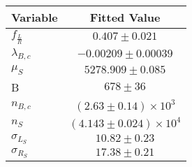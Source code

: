 \begin{tabular}[t]{lc}
\hline
Variable &Fitted Value\\
\hline\hline
$f_{\frac{L}{R}}$&$0.407\pm0.021$\\
\hline
$\lambda_{B,c}$&$-0.00209\pm0.00039$\\
\hline
$\mu_S$&$5278.909\pm0.085$\\
\hline
B&$678\pm36$\\
\hline
$n_{B,c}$&$(2.63\pm0.14)\times 10^3$\\
\hline
$n_S$&$(4.143\pm0.024)\times 10^4$\\
\hline
$\sigma_{L_S}$&$10.82\pm0.23$\\
\hline
$\sigma_{R_S}$&$17.38\pm0.21$\\
\hline
\end{tabular}